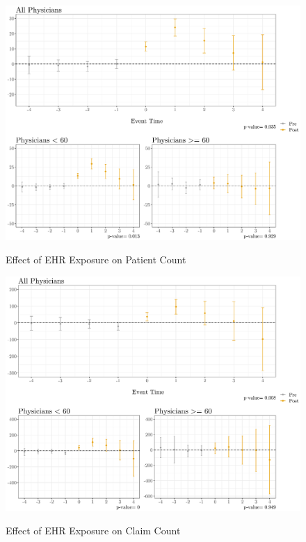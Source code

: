\documentclass[11pt]{article}
\begin{document}
\begin{figure}[p]
    \centering
    \caption{Effect of EHR Exposure on Patient Count}
    \includegraphics[scale=.4]{Objects/patient_plot.pdf}
    \label{fig:patient}
\end{figure}

\begin{figure}[p]
    \centering
    \caption{Effect of EHR Exposure on Claim Count}
    \includegraphics[scale=.4]{Objects/claim_plot.pdf}
    \label{fig:claim}
\end{figure}
\end{document}
